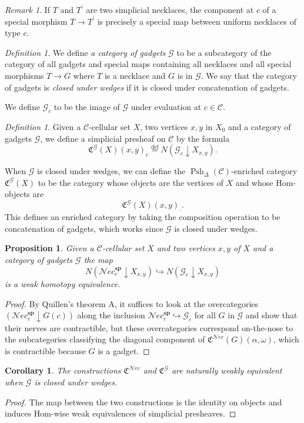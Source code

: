 \documentclass{amsart}
\numberwithin{equation}{section}
\theoremstyle{plain}   %
\newtheorem{prop}[subsection]{Proposition}
\newtheorem{cor}[subsection]{Corollary}
\theoremstyle{remark}
\newtheorem{rem}[subsection]{Remark}
\newtheorem{defn}[subsection]{Definition}
\theoremstyle{plain}
\newcommand{\Nec}{\ensuremath{{\mathcal{N}ec}}}
\newcommand{\overcat}[2]{{\left(#1\downarrow #2\right)}}
\newcommand{\C}{\ensuremath{\mathcal{C}}}
\newcommand{\defeq}{\overset{\mathrm{def}}=}
\newcommand{\spsh}{\ensuremath{\operatorname{Psh}_\Delta(\mathcal{C})}}
\begin{document}
\begin{rem}
	If \(T\) and \(T^\prime\) are two simplicial necklaces, the component at \(c\) of a special morphism \(T\to T^\prime\) is precisely a special map between uniform necklaces of type \(c\).
\end{rem}

\begin{defn}
	We define \emph{a category of gadgets} \(\mathcal{G}\) to be a subcategory of the category of all gadgets and special maps containing all necklaces and all special morphisms \(T\to G\) where \(T\) is a necklace and \(G\) is in \(\mathcal{G}\).  We say that the category of gadgets is \emph{closed under wedges} if it is closed under concatenation of gadgets.

	We define \(\mathcal{G}_c\) to be the image of \(\mathcal{G}\) under evaluation at \(c\in \C\).
\end{defn}

\begin{defn}
	Given a \(\C\)-cellular set \(X\), two vertices \(x,y\) in \(X_0\) and a category of gadgets \(\mathcal{G}\), we define a simplicial presheaf on \(\C\) by the formula \[\mathfrak{C}^{\mathcal{G}}(X)(x,y)_c\defeq N\overcat{\mathcal{G}_c}{X_{x,y}}.\]

	When \(\mathcal{G}\) is closed under wedges, we can define the \(\spsh\)-enriched category \(\mathfrak{C}^{\mathcal{G}}(X)\) to be the category whose objects are the vertices of \(X\) and whose Hom-objects are
	\[\mathfrak{C}^{\mathcal{G}}(X)(x,y)_\cdot.\]
	This defines an enriched category by taking the composition operation to be concatenation of gadgets, which works since \(\mathcal{G}\) is closed under wedges.
\end{defn}
\begin{prop}\label{gadgetlemma}
	Given a \(\C\)-cellular set \(X\) and two vertices \(x,y\) of \(X\) and a category of gadgets \(\mathcal{G}\) the map \[N\overcat{\Nec^\mathbf{sp}_c}{X_{x,y}} \hookrightarrow N\overcat{\mathcal{G}_c}{X_{x,y}}\] is a weak homotopy equivalence.
\end{prop}
\begin{proof}
	By Quillen's theorem A, it suffices to look at the overcategories \(\overcat{\Nec^\mathbf{sp}_c}{G(c)}\) along the inclusion \(\Nec^\mathbf{sp}_c\hookrightarrow \mathcal{G}_c\) for all \(G\) in \(\mathcal{G}\) and show that their nerves are contractible, but these overcategories correspond on-the-nose to the subcategories classifying the diagonal component of \(\mathfrak{C}^\Nec(G)(\alpha,\omega)\), which is contractible because \(G\) is a gadget.
\end{proof}
\begin{cor}
	The constructions \(\mathfrak{C}^\Nec\) and \(\mathfrak{C}^\mathcal{G}\) are naturally weakly equivalent when \(\mathcal{G}\) is closed under wedges.
\end{cor}
\begin{proof}
	The map between the two constructions is the identity on objects and induces Hom-wise weak equivalences of simplicial presheaves.
\end{proof}
\end{document}
